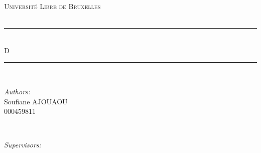 \documentclass[twoside,12pt, a4paper]{report}
\begin{document}
\begin{titlepage}
\newcommand{\HRule}{\rule{\linewidth}{0.5mm}} %

\center %
 

\textsc{\LARGE Université Libre de Bruxelles}\\[1.5cm] %
\textsc{\Large }\\[0.5cm] %


\HRule \\[0.4cm]
{ \huge D \bfseries }\\[0.4cm] %
\HRule \\[1.2cm]
 

\begin{minipage}{0.4\textwidth}
\begin{flushleft} \large
\emph{Authors:}\\
Soufiane \textsc{AJOUAOU}\\  000459811\\


\end{flushleft}
\end{minipage}
~
\begin{minipage}{0.5\textwidth}
\begin{flushright} 
\emph{Supervisors:} \\
 \textsc{}\\


\end{flushright}
\end{minipage}\\[2cm]



\end{titlepage}
\end{document}
